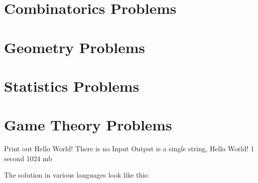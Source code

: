 \documentclass[12pt]{article}
\begin{document}
\hspace{0mm}

\section{Combinatorics Problems}

\hspace{0mm}

\section{Geometry Problems}

\hspace{0mm}

\section{Statistics Problems}

\hspace{0mm}

\section{Game Theory Problems}

\pagebreak

{Print out Hello World!}
{There is no Input}
{Output is a single string, Hello World!}
{1 second}
{1024 mb}
{}

\hrulefill

The solution in various languages look like this:

\end{document}
